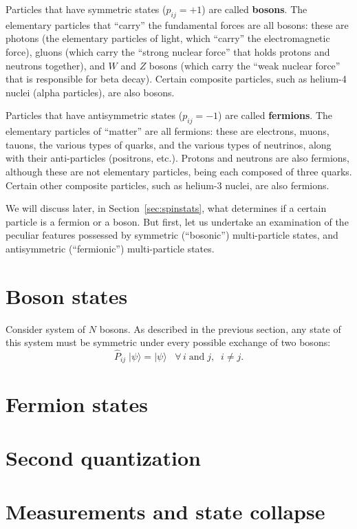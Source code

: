 \documentclass[pra,11pt]{revtex4}
\begin{document}
Particles that have symmetric states ($p_{ij} = +1$) are called
\textbf{bosons}.  The elementary particles that ``carry'' the
fundamental forces are all bosons: these are photons (the elementary
particles of light, which ``carry'' the electromagnetic force), gluons
(which carry the ``strong nuclear force'' that holds protons and
neutrons together), and $W$ and $Z$ bosons (which carry the ``weak
nuclear force'' that is responsible for beta decay).  Certain
composite particles, such as helium-4 nuclei (alpha particles), are
also bosons.

Particles that have antisymmetric states ($p_{ij} = -1$) are called
\textbf{fermions}.  The elementary particles of ``matter'' are all
fermions: these are electrons, muons, tauons, the various types of
quarks, and the various types of neutrinos, along with their
anti-particles (positrons, etc.).  Protons and neutrons are also
fermions, although these are not elementary particles, being each
composed of three quarks.  Certain other composite particles, such as
helium-3 nuclei, are also fermions.

We will discuss later, in Section~\ref{sec:spinstats}, what determines
if a certain particle is a fermion or a boson.  But first, let us
undertake an examination of the peculiar features possessed by
symmetric (``bosonic'') multi-particle states, and antisymmetric
(``fermionic'') multi-particle states.

\section{Boson states}

Consider system of $N$ bosons.  As described in the previous section,
any state of this system must be symmetric under every possible
exchange of two bosons:
$$\hat{P}_{ij}\; |\psi\rangle = |\psi\rangle \;\;\; \forall\, i\;\textrm{and}\;j,\;\; i\ne j.$$


\section{Fermion states}

\section{Second quantization}

\section{Measurements and state collapse}
\end{document}
